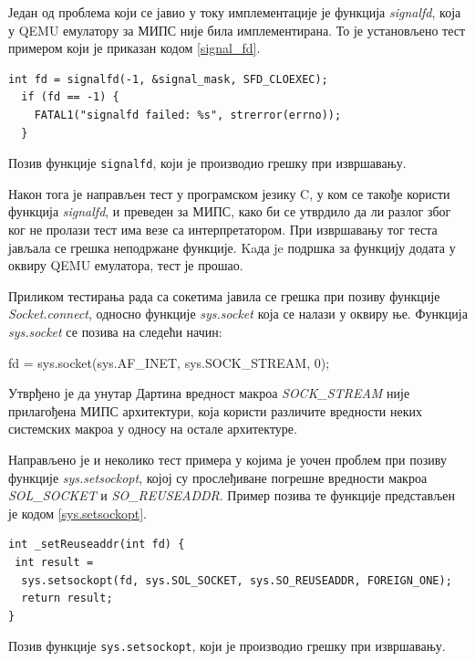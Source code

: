 \documentclass[12pt,oneside]{memoir}
\begin{document}
Један од проблема који се јавио у току имплементације је функција \textit{signalfd}, која у QEMU емулатору за МИПС није била имплементирана. То је установљено тест примером који је приказан кодом \ref{signal_fd}.\\

\begin{listing}
\begin{verbatim}
int fd = signalfd(-1, &signal_mask, SFD_CLOEXEC);
  if (fd == -1) {
    FATAL1("signalfd failed: %s", strerror(errno));
  }
\end{verbatim}
\caption{Позив функције \texttt{signalfd}, који је производио грешку при извршавању.}
\label{signal_fd}
\end{listing}

Након тога је направљен тест у програмском језику C, у ком се такође користи функција \textit{signalfd}, и преведен за МИПС, како би се утврдило да ли разлог због ког не пролази тест има везе са интерпретатором. При извршавању тог теста јављала се грешка неподржане функције. Kaда je подршка за функцију додата у оквиру QEMU емулатора, тест је прошао.

Приликом тестирања рада са сокетима јавила се грешка при позиву функције \textit{Socket.connect}, односно функције \textit{sys.socket} која се налази у оквиру ње. Функција \textit{sys.socket} се позива на следећи начин: 

fd = sys.socket(sys.AF\_INET, sys.SOCK\_STREAM, 0);

Утврђено је да унутар Дартина вредност макроа \textit{SOCK\_STREAM} није прилагођена МИПС архитектури, која користи различите вредности неких системских макроа у односу на остале архитектуре.

Направљено је и неколико тест примера у којима је уочен проблем при позиву функције \textit{sys.setsockopt}, којој су прослеђиване погрешне вредности макроа \textit{SOL\_SOCKET} и \textit{SO\_REUSEADDR}. Пример позива те функције представљен је кодом \ref{sys.setsockopt}.\\

\begin{listing}
\begin{verbatim}
int _setReuseaddr(int fd) {
 int result =
  sys.setsockopt(fd, sys.SOL_SOCKET, sys.SO_REUSEADDR, FOREIGN_ONE);
  return result;
}
\end{verbatim}
\caption{Позив функције \texttt{sys.setsockopt}, који је производио грешку при извршавању.}
\label{sys.setsockopt}
\end{listing}
\end{document}
